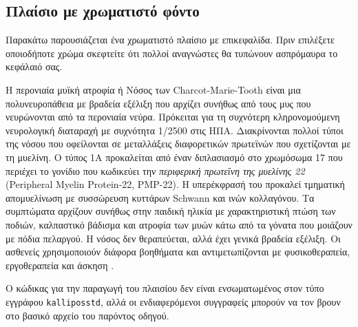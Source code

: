 \begin{refsection}
\subsection{Πλαίσιο με χρωματιστό φόντο}
Παρακάτω παρουσιάζεται ένα χρωματιστό πλαίσιο με επικεφαλίδα. Πριν επιλέξετε οποιοδήποτε χρώμα σκεφτείτε
ότι πολλοί αναγνώστες θα τυπώνουν ασπρόμαυρα το κεφάλαιό σας.
\begin{kalbox}[frametitle=Περονιαία μυϊκή ατροφία]
Η περονιαία μυϊκή ατροφία ή Nόσος των Charcot-Marie-Tooth είναι μια πολυνευροπάθεια με βραδεία εξέλιξη που αρχίζει συνήθως από τους μυς που νευρώνονται από τα περονιαία νεύρα. Πρόκειται για τη συχνότερη κληρονομούμενη νευρολογική διαταραχή με συχνότητα 1/2500 στις ΗΠΑ. Διακρίνονται πολλοί τύποι της νόσου που οφείλονται σε μεταλλάξεις διαφορετικών πρωτεϊνών που σχετίζονται με τη μυελίνη. Ο τύπος 1Α προκαλείται από έναν διπλασιασμό στο χρωμόσωμα 17 που περιέχει το γονίδιο που κωδικεύει την \emph{περιφερική πρωτεΐνη της μυελίνης 22} (Peripheral Myelin Protein-22, PMP-22). Η υπερέκφρασή του προκαλεί τμηματική απομυελίνωση με συσσώρευση κυττάρων Schwann και ινών κολλαγόνου. Τα συμπτώματα αρχίζουν συνήθως στην παιδική ηλικία με χαρακτηριστική πτώση των ποδιών, καλπαστικό βάδισμα και ατροφία των μυών κάτω από τα γόνατα που μοιάζουν με πόδια πελαργού. Η νόσος δεν θεραπεύεται, αλλά έχει γενικά βραδεία εξέλιξη. Οι ασθενείς χρησιμοποιούν διάφορα βοηθήματα και αντιμετωπίζονται με φυσικοθεραπεία, εργοθεραπεία και άσκηση \cite{papan2}.
\end{kalbox}

Ο κώδικας για την παραγωγή του πλαισίου δεν είναι ενσωματωμένος στον τύπο εγγράφου \texttt{kalliposstd},
αλλά οι ενδιαφερόμενοι συγγραφείς μπορούν να τον βρουν στο βασικό αρχείο του παρόντος οδηγού.


\end{refsection}
